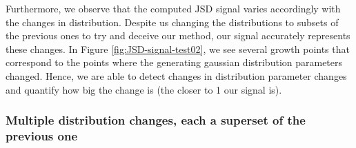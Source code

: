 Furthermore, we observe that the computed JSD signal varies accordingly with the changes in distribution. Despite us changing the distributions to subsets of the previous ones to try and deceive our method, our signal accurately represents these changes. In Figure \ref{fig:JSD-signal-test02}, we see several growth points that correspond to the points where the generating gaussian distribution parameters changed. Hence, we are able to detect changes in distribution parameter changes and quantify how big the change is (the closer to 1 our signal is).

\subsubsection{Multiple distribution changes, each a superset of the previous one}

